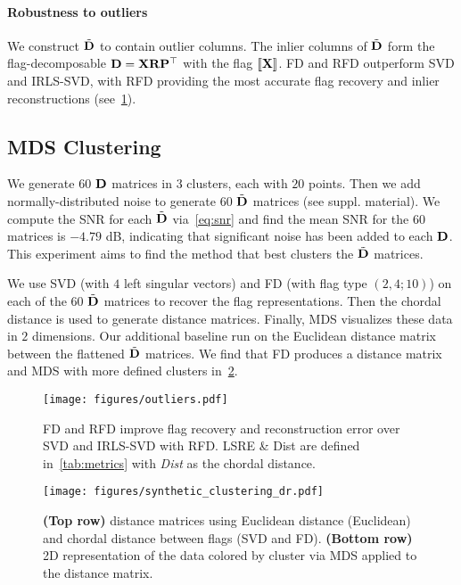 \paragraph{Robustness to outliers}
We construct $\tilde{\mathbf{D}}$ to contain outlier columns. The inlier columns of $\tilde{\mathbf{D}}$ form the flag-decomposable $\mathbf{D} = \mathbf{X} \mathbf{R} \mathbf{P}^\top$ with the flag $[\![\mathbf{X}]\!]$. 
FD and RFD outperform SVD and IRLS-SVD, with RFD providing the most accurate flag recovery and inlier reconstructions (see~\cref{fig:synthetic_outliers}).




\subsection{MDS Clustering}\label{sec:mds clustering}


We generate $60$ $\mathbf{D}$ matrices in $3$ clusters, each with $20$ points. Then we add normally-distributed noise to generate $60$ $\tilde{\mathbf{D}}$ matrices (see suppl. material). We compute the SNR for each $\tilde{\mathbf{D}}$ via~\cref{eq:snr} and find the mean SNR for the $60$ matrices is $-4.79$ dB, indicating that significant noise has been added to each $\mathbf{D}$. This experiment aims to find the method that best clusters the $\tilde{\mathbf{D}}$ matrices.



We use SVD (with $4$ left singular vectors) and FD (with flag type $(2,4;10)$) on each of the $60$ $\tilde{\mathbf{D}}$ matrices to recover the flag representations. Then the chordal distance is used to generate distance matrices. Finally, MDS visualizes these data in $2$ dimensions. Our additional baseline run on the Euclidean distance matrix between the flattened $\tilde{\mathbf{D}}$ matrices. We find that FD produces a distance matrix and MDS with more defined clusters in~\cref{fig:synthetic_clustering}.

\begin{figure}[t!]
    \centering
    \texttt{[image: figures/outliers.pdf]}
    \caption{FD and RFD improve flag recovery and reconstruction error over SVD and IRLS-SVD with RFD. LSRE \& Dist are defined in~\cref{tab:metrics} with \emph{Dist} as the chordal distance.}
    \label{fig:synthetic_outliers}
\end{figure}

\begin{figure}[b]
\vspace{-3mm}
    \centering
    \texttt{[image: figures/synthetic\_clustering\_dr.pdf]}
    \vspace{-4mm}
    \caption{\textbf{(Top row)} distance matrices using Euclidean distance (Euclidean) and chordal distance between flags (SVD and FD). \textbf{(Bottom row)} 2D representation of the data colored by cluster via MDS applied to the distance matrix.}
    \label{fig:synthetic_clustering}
\end{figure}


